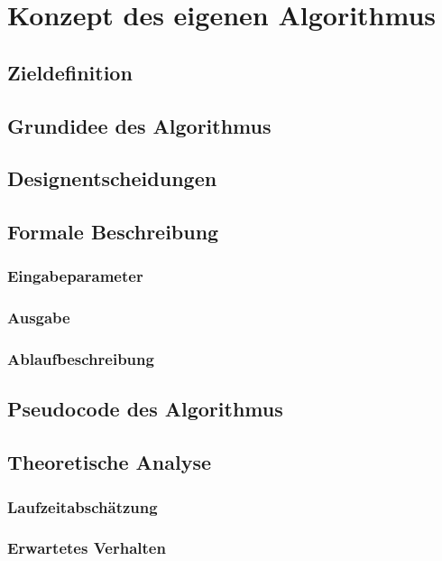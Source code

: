 \chapter{Konzept des eigenen Algorithmus} %
\label{chap:algorithmus}

\section{Zieldefinition}

\section{Grundidee des Algorithmus}

\section{Designentscheidungen}

\section{Formale Beschreibung}

\subsection{Eingabeparameter}

\subsection{Ausgabe}

\subsection{Ablaufbeschreibung}

\section{Pseudocode des Algorithmus}

\section{Theoretische Analyse}

\subsection{Laufzeitabschätzung}

\subsection{Erwartetes Verhalten}